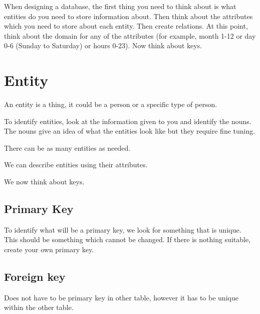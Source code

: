 When designing a database, the first thing you need to think about is what entities do you need to store information about. Then think about the attributes which you need to store about each entity. Then create relations. At this point, think about the domain for any of the attributes (for example, month 1-12 or day 0-6 (Sunday to Saturday) or hours 0-23). Now think about keys.
\section*{Entity}
An entity is a thing, it could be a person or a specific type of person. 

To identify entities, look at the information given to you and identify the nouns. The nouns give an idea of what the entities look like but they require fine tuning.

There can be as many entities as needed. 

We can describe entities using their attributes.

We now think about keys.
\subsection*{Primary Key}
To identify what will be a primary key, we look for something that is unique. This should be something which cannot be changed. If there is nothing suitable, create your own primary key.
\subsection*{Foreign key}
Does not have to be primary key in other table, however it has to be unique within the other table.